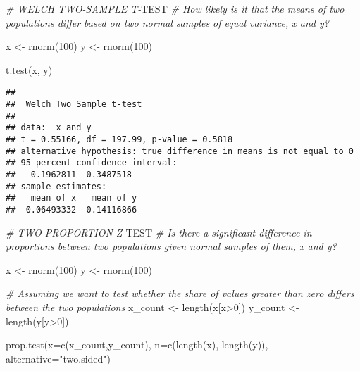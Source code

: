 \documentclass[
]{article}
\newenvironment{Shaded}{\begin{snugshade}}{\end{snugshade}}
\newcommand{\AlertTok}[1]{\textcolor[rgb]{0.94,0.16,0.16}{#1}}
\newcommand{\AttributeTok}[1]{\textcolor[rgb]{0.77,0.63,0.00}{#1}}
\newcommand{\CommentTok}[1]{\textcolor[rgb]{0.56,0.35,0.01}{\textit{#1}}}
\newcommand{\DecValTok}[1]{\textcolor[rgb]{0.00,0.00,0.81}{#1}}
\newcommand{\FunctionTok}[1]{\textcolor[rgb]{0.00,0.00,0.00}{#1}}
\newcommand{\NormalTok}[1]{#1}
\newcommand{\OtherTok}[1]{\textcolor[rgb]{0.56,0.35,0.01}{#1}}
\newcommand{\SpecialCharTok}[1]{\textcolor[rgb]{0.00,0.00,0.00}{#1}}
\newcommand{\StringTok}[1]{\textcolor[rgb]{0.31,0.60,0.02}{#1}}
\begin{document}
\begin{Shaded}
\begin{Highlighting}[]
\CommentTok{\# WELCH TWO{-}SAMPLE T{-}}\AlertTok{TEST}
\CommentTok{\# How likely is it that the means of two populations differ based on two normal samples of equal variance, x and y?}

\NormalTok{x }\OtherTok{\textless{}{-}} \FunctionTok{rnorm}\NormalTok{(}\DecValTok{100}\NormalTok{)}
\NormalTok{y }\OtherTok{\textless{}{-}} \FunctionTok{rnorm}\NormalTok{(}\DecValTok{100}\NormalTok{)}

\FunctionTok{t.test}\NormalTok{(x, y)}
\end{Highlighting}
\end{Shaded}

\begin{verbatim}
## 
##  Welch Two Sample t-test
## 
## data:  x and y
## t = 0.55166, df = 197.99, p-value = 0.5818
## alternative hypothesis: true difference in means is not equal to 0
## 95 percent confidence interval:
##  -0.1962811  0.3487518
## sample estimates:
##   mean of x   mean of y 
## -0.06493332 -0.14116866
\end{verbatim}

\begin{Shaded}
\begin{Highlighting}[]
\CommentTok{\# TWO PROPORTION Z{-}}\AlertTok{TEST}
\CommentTok{\# Is there a significant difference in proportions between two populations given normal samples of them, x and y?}

\NormalTok{x }\OtherTok{\textless{}{-}} \FunctionTok{rnorm}\NormalTok{(}\DecValTok{100}\NormalTok{)}
\NormalTok{y }\OtherTok{\textless{}{-}} \FunctionTok{rnorm}\NormalTok{(}\DecValTok{100}\NormalTok{)}

\CommentTok{\# Assuming we want to test whether the share of values greater than zero differs between the two populations}
\NormalTok{x\_count }\OtherTok{\textless{}{-}} \FunctionTok{length}\NormalTok{(x[x}\SpecialCharTok{\textgreater{}}\DecValTok{0}\NormalTok{])}
\NormalTok{y\_count }\OtherTok{\textless{}{-}} \FunctionTok{length}\NormalTok{(y[y}\SpecialCharTok{\textgreater{}}\DecValTok{0}\NormalTok{])}

\FunctionTok{prop.test}\NormalTok{(}\AttributeTok{x=}\FunctionTok{c}\NormalTok{(x\_count,y\_count), }\AttributeTok{n=}\FunctionTok{c}\NormalTok{(}\FunctionTok{length}\NormalTok{(x), }\FunctionTok{length}\NormalTok{(y)), }\AttributeTok{alternative=}\StringTok{"two.sided"}\NormalTok{)}
\end{Highlighting}
\end{Shaded}
\end{document}
